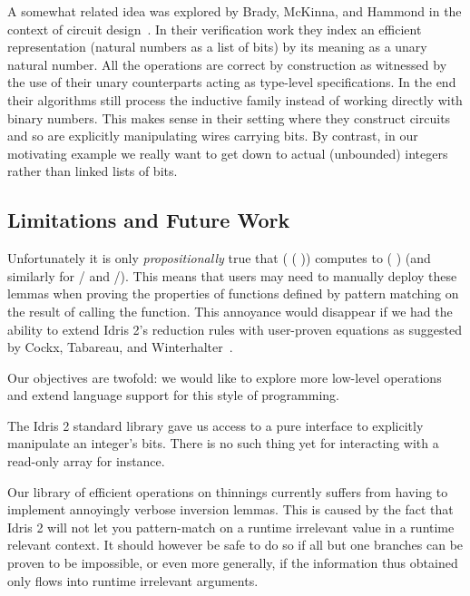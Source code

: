 \documentclass{article}
\newcommand{\idris}{Idris 2}
\begin{document}
A somewhat related idea was explored by Brady, McKinna, and Hammond in the context of
circuit design~\cite{DBLP:conf/sfp/BradyMH07}. In their verification work they index
an efficient representation (natural numbers as a list of bits) by its meaning as a
unary natural number. All the operations are correct by construction as witnessed by
the use of their unary counterparts acting as type-level specifications.
%
In the end their algorithms still process the inductive family instead of working
directly with binary numbers. This makes sense in their setting where they construct
circuits and so are explicitly manipulating wires carrying bits.
%
By contrast, in our motivating example we really want to get down to actual (unbounded)
integers rather than linked lists of bits.


\subsection{Limitations and Future Work}

Unfortunately it is only \emph{propositionally} true that
( (  ))
computes to (  ) (and similarly for
/ and /).
%
This means that users may need to manually deploy these lemmas when proving the
properties of functions defined by pattern matching on the result of calling the
 function.
%
This annoyance would disappear if we had the ability to extend \idris{}'s reduction rules
with user-proven equations as suggested by Cockx, Tabareau, and
Winterhalter~\cite{DBLP:journals/pacmpl/CockxTW21}.

Our objectives are twofold: we would like to explore more low-level operations and
extend language support for this style of programming.

The \idris{} standard library gave us access to a pure interface to explicitly
manipulate an integer's bits. There is no such thing yet for interacting with a
read-only array for instance.



Our library of efficient operations on thinnings currently suffers from having to
implement annoyingly verbose inversion lemmas. This is caused by the fact that
\idris{} will not let you pattern-match on a runtime irrelevant value in a runtime
relevant context. It should however be safe to do so if all but one branches can
be proven to be impossible, or even more generally, if the information thus obtained
only flows into runtime irrelevant arguments.



\end{document}
